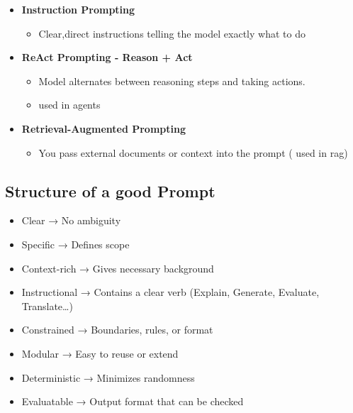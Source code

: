 \documentclass[10pt,a4paper]{article}
\begin{document}
\begin{itemize}
\begin{itemize}
  \item
    Assigning a role to the model so it behaves like a specific expert.
  \end{itemize}
\item
  \textbf{Instruction Prompting}

  \begin{itemize}
  
  \item
    Clear,direct instructions telling the model exactly what to do
  \end{itemize}
\item
  \textbf{ReAct Prompting - Reason + Act}

  \begin{itemize}
  
  \item
    Model alternates between reasoning steps and taking actions.
  \item
    used in agents
  \end{itemize}
\item
  \textbf{Retrieval-Augmented Prompting}

  \begin{itemize}
  
  \item
    You pass external documents or context into the prompt ( used in rag)
  \end{itemize}
\end{itemize}

\subsection{Structure of a good Prompt}\label{structure-of-a-good-prompt}

\begin{itemize}

\item
  Clear → No ambiguity
\item
  Specific → Defines scope
\item
  Context-rich → Gives necessary background
\item
  Instructional → Contains a clear verb (Explain, Generate, Evaluate, Translate\ldots)
\item
  Constrained → Boundaries, rules, or format
\item
  Modular → Easy to reuse or extend
\item
  Deterministic → Minimizes randomness
\item
  Evaluatable → Output format that can be checked
\end{itemize}
\end{document}
